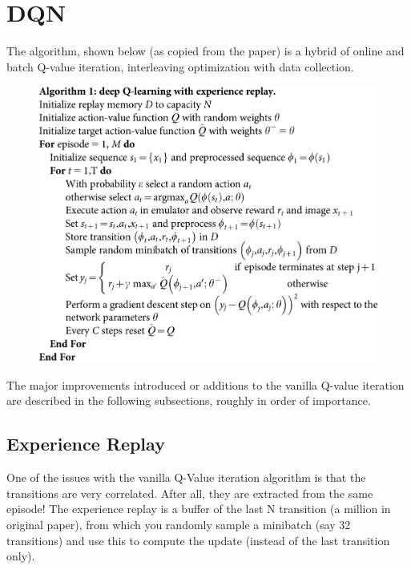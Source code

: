 \documentclass{tufte-handout}
\begin{document}
\section{DQN}
The algorithm, shown below (as copied from the paper) is a hybrid of online  and batch Q-value iteration, interleaving optimization with data collection.
\vspace{-5pt}
\begin{figure}[h]
  \centering
  \includegraphics[width=\linewidth]{dqn}
  \label{fig:dqn}
\end{figure}


\vspace{-5pt}
The major improvements introduced or additions to the vanilla Q-value iteration are described in the following subsections, roughly in order of importance. 

\subsection{Experience Replay}
One of the issues with the vanilla Q-Value iteration algorithm is that the transitions are very correlated. After all, they are extracted from the same episode! The experience replay is a buffer of the last N transition (a million in original paper), from which you randomly sample a minibatch (say 32 transitions) and use this to compute the update (instead of the last transition only). 
\end{document}
